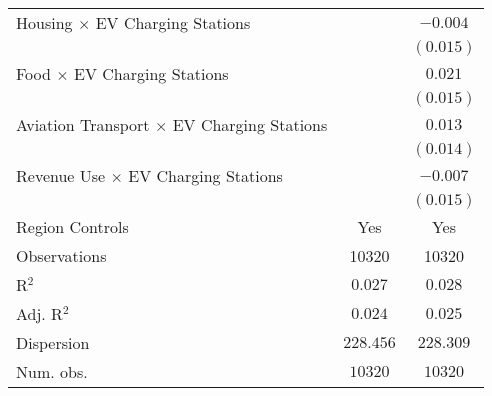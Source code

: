 \begin{center}
\begin{tiny}
\begin{longtable}{l@{} c@{} c@{}}
\quad Housing $\times$ EV Charging Stations            &                  & $-0.004$         \\
                                                       &                  & $(0.015)$        \\
\quad Food $\times$ EV Charging Stations               &                  & $0.021$          \\
                                                       &                  & $(0.015)$        \\
\quad Aviation Transport $\times$ EV Charging Stations &                  & $0.013$          \\
                                                       &                  & $(0.014)$        \\
\quad Revenue Use $\times$ EV Charging Stations        &                  & $-0.007$         \\
                                                       &                  & $(0.015)$        \\
\hline
Region Controls                                        & Yes              & Yes              \\
Observations                                           & 10320            & 10320            \\
R$^2$                                                  & $0.027$          & $0.028$          \\
Adj. R$^2$                                             & $0.024$          & $0.025$          \\
Dispersion                                             & $228.456$        & $228.309$        \\
Num. obs.                                              & $10320$          & $10320$          \\
\end{longtable}
\end{tiny}
\end{center}
